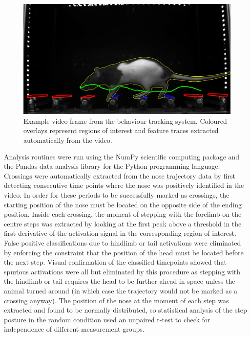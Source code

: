 \begin{figure}
\begin{center}
\includegraphics[width=0.75\columnwidth]{chapters/figuresChBehaviour/videography}
\end{center}
\vspace{-5mm}
\caption{Example video frame from the behaviour tracking system. Coloured overlays represent regions of interest and feature traces extracted automatically from the video.}
\label{fig:videography}
\end{figure}

Analysis routines were run using the NumPy scientific computing package \cite{Walt2011} and the Pandas data analysis library \cite{McKinney2010} for the Python programming language. Crossings were automatically extracted from the nose trajectory data by first detecting consecutive time points where the nose was positively identified in the video. In order for these periods to be successfully marked as crossings, the starting position of the nose must be located on the opposite side of the ending position. Inside each crossing, the moment of stepping with the forelimb on the centre steps was extracted by looking at the first peak above a threshold in the first derivative of the activation signal in the corresponding region of interest. False positive classifications due to hindlimb or tail activations were eliminated by enforcing the constraint that the position of the head must be located before the next step. Visual confirmation of the classified timepoints showed that spurious activations were all but eliminated by this procedure as stepping with the hindlimb or tail requires the head to be further ahead in space unless the animal turned around (in which case the trajectory would not be marked as a crossing anyway). The position of the nose at the moment of each step was extracted and found to be normally distributed, so statistical analysis of the step posture in the random condition used an unpaired t-test to check for independence of different measurement groups.

